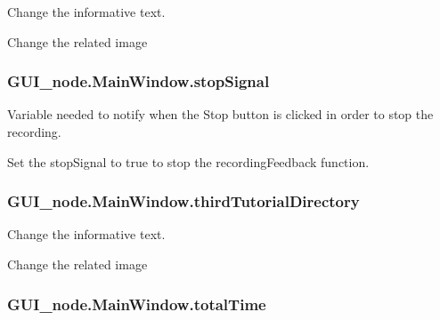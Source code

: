 Change the informative text. 

Change the related image 
\subsubsection[{\texorpdfstring{stop\+Signal}{stopSignal}}]{\setlength{\rightskip}{0pt plus 5cm}G\+U\+I\+\_\+node.\+Main\+Window.\+stop\+Signal}\hypertarget{classGUI__node_1_1MainWindow_aa216ded91d1e59aebbe3fa86f2dc7c5c}{}\label{classGUI__node_1_1MainWindow_aa216ded91d1e59aebbe3fa86f2dc7c5c}


Variable needed to notify when the Stop button is clicked in order to stop the recording. 

Set the stop\+Signal to true to stop the recording\+Feedback function. 
\subsubsection[{\texorpdfstring{third\+Tutorial\+Directory}{thirdTutorialDirectory}}]{\setlength{\rightskip}{0pt plus 5cm}G\+U\+I\+\_\+node.\+Main\+Window.\+third\+Tutorial\+Directory}\hypertarget{classGUI__node_1_1MainWindow_a20e2d3b578d229d24d744e2d50269298}{}\label{classGUI__node_1_1MainWindow_a20e2d3b578d229d24d744e2d50269298}


Change the informative text. 

Change the related image 
\subsubsection[{\texorpdfstring{total\+Time}{totalTime}}]{\setlength{\rightskip}{0pt plus 5cm}G\+U\+I\+\_\+node.\+Main\+Window.\+total\+Time}\hypertarget{classGUI__node_1_1MainWindow_a02198b72f9182a5c79ee3834edf95108}{}\label{classGUI__node_1_1MainWindow_a02198b72f9182a5c79ee3834edf95108}


